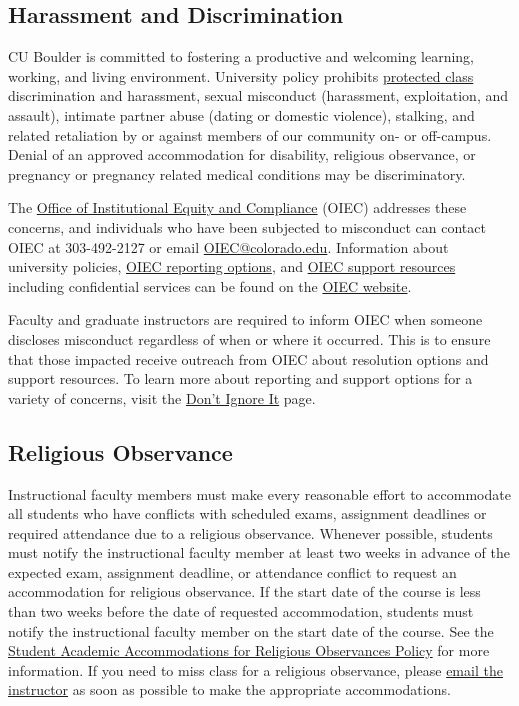 \documentclass[11pt]{memoir}
\begin{document}
\subsection{Harassment and Discrimination}
CU Boulder is committed to fostering a productive and welcoming learning, working, and living environment. University policy prohibits \href{https://www.colorado.edu/oiec/policies/protected-class-nondiscrimination-policy/protected-class-definitions}{protected class} discrimination and harassment, sexual misconduct (harassment, exploitation, and assault), intimate partner abuse (dating or domestic violence), stalking, and related retaliation by or against members of our community on- or off-campus. Denial of an approved accommodation for disability, religious observance, or pregnancy or pregnancy related medical conditions may be discriminatory.

The \href{https://www.colorado.edu/oiec/}{Office of Institutional Equity and Compliance} (OIEC) addresses these concerns, and individuals who have been subjected to misconduct can contact OIEC at 303-492-2127 or email \href{mailto:OIEC@colorado.edu}{OIEC@colorado.edu}. Information about university policies, \href{https://www.colorado.edu/oiec/reporting-resolutions/making-report}{OIEC reporting options}, and \href{https://www.colorado.edu/oiec/support-resources}{OIEC support resources} including confidential services can be found on the \href{https://www.colorado.edu/oiec/}{OIEC website}.

Faculty and graduate instructors are required to inform OIEC when someone discloses misconduct regardless of when or where it occurred. This is to ensure that those impacted receive outreach from OIEC about resolution options and support resources. To learn more about reporting and support options for a variety of concerns, visit the \href{https://www.colorado.edu/dontignoreit/}{Don’t Ignore It} page.

\subsection{Religious Observance}
Instructional faculty members must make every reasonable effort to accommodate all students who have conflicts with scheduled exams, assignment deadlines or required attendance due to a religious observance. Whenever possible, students must notify the instructional faculty member at least two weeks in advance of the expected exam, assignment deadline, or attendance conflict to request an accommodation for religious observance. If the start date of the course is less than two weeks before the date of requested accommodation, students must notify the instructional faculty member on the start date of the course. See the \href{https://www.colorado.edu/compliance/student-academic-accommodations-religious-observances-policy
}{Student Academic Accommodations for Religious Observances Policy} for more information.  If you need to miss class for a religious observance, please \href{mailto:brian.keegan@colorado.edu}{email the instructor} as soon as possible to make the appropriate accommodations.
\end{document}
